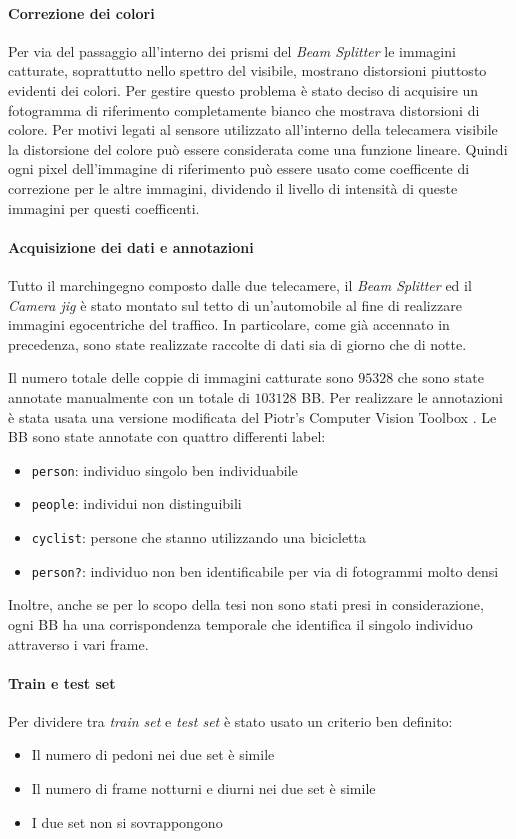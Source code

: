 \paragraph{Correzione dei colori}
Per via del passaggio all'interno dei prismi del \textit{Beam Splitter} le immagini catturate, soprattutto nello spettro del visibile, mostrano distorsioni piuttosto evidenti dei colori. Per gestire questo problema è stato deciso di acquisire un fotogramma di riferimento completamente bianco che mostrava distorsioni di colore. Per motivi legati al sensore utilizzato all'interno della telecamera visibile la distorsione del colore può essere considerata come una funzione lineare. Quindi ogni pixel dell'immagine di riferimento può essere usato come coefficente di correzione per le altre immagini, dividendo il livello di intensità di queste immagini per questi coefficenti.
\paragraph{Acquisizione dei dati e annotazioni}
Tutto il marchingegno composto dalle due telecamere, il \textit{Beam Splitter} ed il \textit{Camera jig} è stato montato sul tetto di un'automobile al fine di realizzare immagini egocentriche del traffico. In particolare, come già accennato in precedenza, sono state realizzate raccolte di dati sia di giorno che di notte.

Il numero totale delle coppie di immagini catturate sono $95328$ che sono state annotate manualmente con un totale di $103128$ \ac{BB}. Per realizzare le annotazioni è stata usata una versione modificata del Piotr's Computer Vision Toolbox \cite{PMT}. Le \ac{BB} sono state annotate con quattro differenti label:
\begin{itemize}
    \item \texttt{person}: individuo singolo ben individuabile
    \item \texttt{people}: individui non distinguibili
    \item \texttt{cyclist}: persone che stanno utilizzando una bicicletta
    \item \texttt{person?}: individuo non ben identificabile per via di fotogrammi molto densi
\end{itemize}
Inoltre, anche se per lo scopo della tesi non sono stati presi in considerazione, ogni \ac{BB} ha una corrispondenza temporale che identifica il singolo individuo attraverso i vari frame.
\paragraph{Train e test set}
Per dividere tra \textit{train set} e \textit{test set} è stato usato un criterio ben definito:
\begin{itemize}
    \item Il numero di pedoni nei due set è simile
    \item Il numero di frame notturni e diurni nei due set è simile
    \item I due set non si sovrappongono
\end{itemize}
